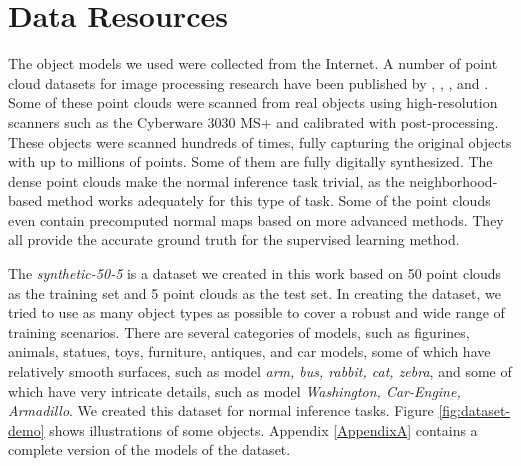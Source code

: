 \section{Data Resources}
The object models we used were collected from the Internet.
A number of point cloud datasets for image processing research have been published by \cite{data1}, \cite{data2}, \cite{data3}, and \cite{data4}. Some of these point clouds were scanned from real objects using high-resolution scanners such as the Cyberware 3030 MS+ and calibrated with post-processing. These objects were scanned hundreds of times, fully capturing the original objects with up to millions of points\cite{data1}. Some of them are fully digitally synthesized. The dense point clouds make the normal inference task trivial, as the neighborhood-based method works adequately for this type of task. Some of the point clouds even contain precomputed normal maps based on more advanced methods. They all provide the accurate ground truth for the supervised learning method.

The \textit{synthetic-50-5} is a dataset we created in this work based on 50 point clouds as the training set and 5 point clouds as the test set. In creating the dataset, we tried to use as many object types as possible to cover a robust and wide range of training scenarios. There are several categories of models, such as figurines, animals, statues, toys, furniture, antiques, and car models, some of which have relatively smooth surfaces, such as model \textit{arm, bus, rabbit, cat, zebra}, and some of which have very intricate details, such as model \textit{Washington, Car-Engine, Armadillo}. 
We created this dataset for normal inference tasks. Figure \ref{fig:dataset-demo} shows illustrations of some objects. Appendix \ref{AppendixA} contains a complete version of the models of the dataset.


